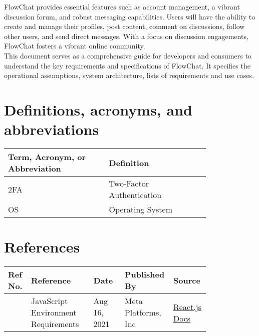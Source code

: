 \documentclass[a4paper,11pt]{scrreprt}
\begin{document}
\noindent FlowChat provides essential features such as account management, a vibrant discussion forum, and robust messaging capabilities. Users will have the ability to create and manage their profiles, post content, comment on discussions, follow other users, and send direct messages. With a focus on discussion engagements, FlowChat fosters a vibrant online community. \\

\noindent This document serves as a comprehensive guide for developers and consumers to understand the key requirements and specifications of FlowChat. It specifies the operational assumptions, system architecture, lists of requirements and use cases.

\section{Definitions, acronyms, and abbreviations}
\begin{center}
\begin{tabular}{|>{\centering\arraybackslash}p{0.4\linewidth}|>{\centering\arraybackslash}p{0.4\linewidth}|} \hline
     Term, Acronym, or Abbreviation&  Definition\\ \hline 
     2FA&  Two-Factor Authentication\\ \hline 
     OS&  Operating System\\ \hline 
\end{tabular}
\end{center}


\section{References}
\begin{center}
\begin{tabular}{|>{\centering\arraybackslash}p{0.1\linewidth}|>{\centering\arraybackslash}p{0.3\linewidth}|>{\centering\arraybackslash}p{0.15\linewidth}|>{\centering\arraybackslash}p{0.15\linewidth}|>{\centering\arraybackslash}p{0.1\linewidth}|} \hline
     Ref No.& Reference& Date& Published By& Source\\ \hline 
     1&  JavaScript Environment Requirements&  Aug 16, 2021& Meta Platforms, Inc& \href{https://legacy.reactjs.org/docs/javascript-environment-requirements.html}{React.js Docs}\\\hline 
\end{tabular}
\end{center}

\bigskip\bigskip
\end{document}
